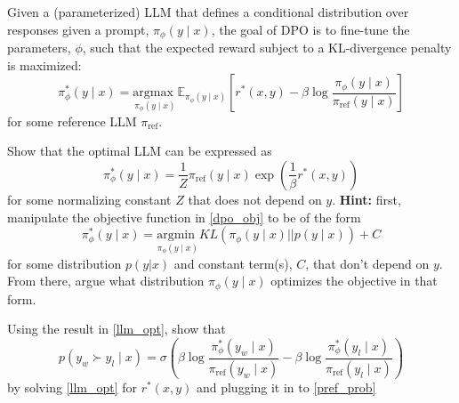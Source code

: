 \documentclass[11pt,addpoints,answers]{exam}
\begin{document}
\begin{questions}
\begin{parts}
Given a (parameterized) LLM that defines a conditional distribution over responses given a prompt, $\pi_{\phi}(y \mid x)$, the goal of DPO is to fine-tune the parameters, $\phi$, such that the expected reward subject to a KL-divergence penalty is maximized:
\begin{equation}
    \pi_{\phi}^*(y \mid x) = \underset{\pi_{\phi}(y \mid x)}{\textrm{argmax }} \mathbb{E}_{\pi_{\phi}(y \mid x)}\left[r^*(x,y) - \beta \log \frac{\pi_{\phi}(y \mid x)}{\pi_{\textrm{ref}}(y \mid x)}\right]
    \label{dpo_obj}
\end{equation}
for some reference LLM $\pi_{\textrm{ref}}$. 

\begin{subparts}

\clearpage
    \subpart[5] Show that the optimal LLM can be expressed as 
    \begin{equation}
        \pi_{\phi}^*(y \mid x) = \frac{1}{Z}\pi_{\textrm{ref}}(y \mid x)\exp \left(\frac{1}{\beta}r^*(x,y)\right)
        \label{llm_opt}
    \end{equation} 
    for some normalizing constant $Z$ that does not depend on $y$. \textbf{Hint:} first, manipulate the objective function in \eqref{dpo_obj} to be of the form  
    \begin{equation}
        \pi_{\phi}^*(y \mid x) = \underset{\pi_{\phi}(y \mid x)}{\textrm{argmin }} KL\left(\pi_{\phi}(y \mid x) || p(y \mid x)\right) + C
    \end{equation} 
    for some distribution $p (y | x)$ and constant term(s), $C$, that don't depend on $y$. From there, argue what distribution $\pi_{\phi}(y \mid x)$ optimizes the objective in that form. 
    
    \begin{answer_box}[title=,height=12cm, width=14.5cm]
    \end{answer_box}

\clearpage
    \subpart[3] Using the result in \eqref{llm_opt}, show that
    \begin{equation}
        p\left(y_w \succ y_l \mid x \right) = \sigma\left(\beta \log \frac{\pi_{\phi}^*(y_w \mid x)}{\pi_{\textrm{ref}}(y_w \mid x)} - \beta \log \frac{\pi_{\phi}^*(y_l \mid x)}{\pi_{\textrm{ref}}(y_l \mid x)} \right)
        \label{pref_llm}
    \end{equation}
    by solving \eqref{llm_opt} for $r^*(x,y)$ and plugging it in to 
    \eqref{pref_prob}
    
    \begin{answer_box}[title=,height=12cm, width=14.5cm]
    \end{answer_box}


\end{subparts}
\end{parts}
\end{questions}
\end{document}
